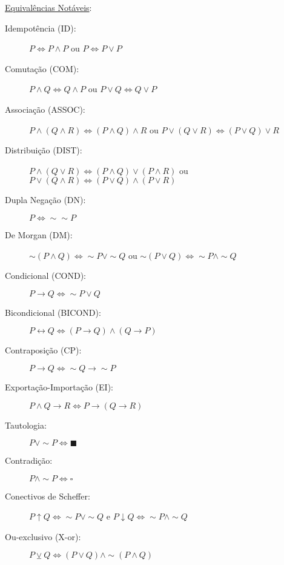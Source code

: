 \documentclass[12pt]{article}
\begin{document}
\underline{Equivalências Notáveis}:
\begin{description}
\item[Idempotência (ID):] $P\Leftrightarrow P\wedge P$ ou $P\Leftrightarrow P\vee P$
\item[Comutação (COM):] $P\wedge Q\Leftrightarrow Q\wedge P$ ou $P\vee Q\Leftrightarrow Q\vee P$
\item[Associação (ASSOC):] $P\wedge(Q\wedge R)\Leftrightarrow (P\wedge Q)\wedge R$ ou $P\vee(Q\vee R)\Leftrightarrow (P\vee Q)\vee R$ 
\item[Distribuição (DIST):] $P\wedge(Q\vee R)\Leftrightarrow (P\wedge Q)\vee (P \wedge R)$ ou $P\vee(Q\wedge R)\Leftrightarrow (P\vee Q)\wedge (P\vee R)$
\item[Dupla Negação (DN):] $P\Leftrightarrow\sim\sim P$
\item[De Morgan (DM):] $\sim(P \wedge Q) \Leftrightarrow \sim P \vee\sim Q$ ou $\sim(P \vee Q) \Leftrightarrow \sim P \wedge\sim Q$
\item[Condicional (COND):] $P\rightarrow Q \Leftrightarrow\sim P \vee Q$

\item[Bicondicional (BICOND):] $P\leftrightarrow Q \Leftrightarrow (P\rightarrow Q)\wedge(Q\rightarrow P)$

\item[Contraposição (CP):] $P\rightarrow Q \Leftrightarrow \sim Q\rightarrow\sim P$

\item[Exportação-Importação (EI):] $P\wedge Q\rightarrow R \Leftrightarrow P\rightarrow(Q\rightarrow R)$

\item[Tautologia:] $P\vee \sim P \Leftrightarrow  \blacksquare  $

\item[Contradição:] $ P\wedge \sim P \Leftrightarrow \square $

\item[Conectivos de Scheffer:] $P \uparrow Q \Leftrightarrow \sim P \vee \sim Q$ e $P \downarrow Q \Leftrightarrow \sim P \wedge \sim Q$ 

\item[Ou-exclusivo (X-or):] $P \veebar Q \Leftrightarrow (P \vee Q) \wedge\sim (P \wedge Q)$

\end{description}
%
\end{document}
